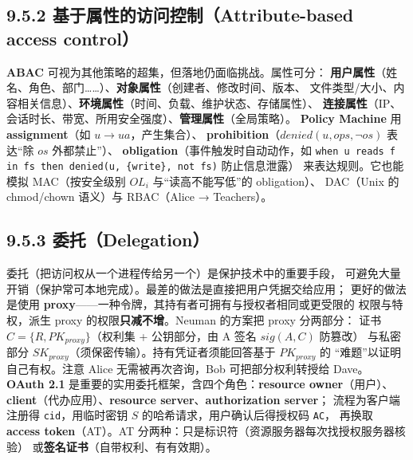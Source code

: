 \begin{closeread}
\end{closeread}


\subsection*{9.5.2 基于属性的访问控制（Attribute-based access control）}
\textbf{ABAC} 可视为其他策略的超集，但落地仍面临挑战。属性可分：
\textbf{用户属性}（姓名、角色、部门……）、\textbf{对象属性}（创建者、修改时间、版本、
文件类型/大小、内容相关信息）、\textbf{环境属性}（时间、负载、维护状态、存储属性）、
\textbf{连接属性}（IP、会话时长、带宽、所用安全强度）、\textbf{管理属性}（全局策略）。
\textbf{Policy Machine} 用 \textbf{assignment}（如 $u \to ua$，产生集合）、
\textbf{prohibition}（$denied(u, ops, \neg os)$ 表达“除 $os$ 外都禁止”）、
\textbf{obligation}（事件触发时自动动作，如
\texttt{when u reads f in fs then denied(u, \{write\}, not fs)} 防止信息泄露）
来表达规则。它也能模拟 MAC（按安全级别 $OL_i$ 与“读高不能写低”的 obligation）、
DAC（Unix 的 chmod/chown 语义）与 RBAC（Alice → Teachers）。

\begin{closeread}
\end{closeread}


\subsection*{9.5.3 委托（Delegation）}
委托（把访问权从一个进程传给另一个）是保护技术中的重要手段，
可避免大量开销（保护常可本地完成）。最差的做法是直接把用户凭据交给应用；
更好的做法是使用 \textbf{proxy}——一种令牌，其持有者可拥有与授权者相同或更受限的
权限与特权，派生 proxy 的权限\textbf{只减不增}。Neuman 的方案把 proxy 分两部分：
证书 $C = \{R, PK_{proxy}\}$（权利集 + 公钥部分，由 A 签名 $sig(A,C)$ 防篡改）
与私密部分 $SK_{proxy}$（须保密传输）。持有凭证者须能回答基于 $PK_{proxy}$ 的
“难题”以证明自己有权。注意 Alice 无需被再次咨询，Bob 可把部分权利转授给 Dave。
\textbf{OAuth 2.1} 是重要的实用委托框架，含四个角色：\textbf{resource owner}（用户）、
\textbf{client}（代办应用）、\textbf{resource server}、\textbf{authorization server}；
流程为客户端注册得 \texttt{cid}，用临时密钥 $S$ 的哈希请求，用户确认后得授权码 \texttt{AC}，
再换取 \textbf{access token}（AT）。AT 分两种：只是标识符（资源服务器每次找授权服务器核验）
或\textbf{签名证书}（自带权利、有有效期）。

